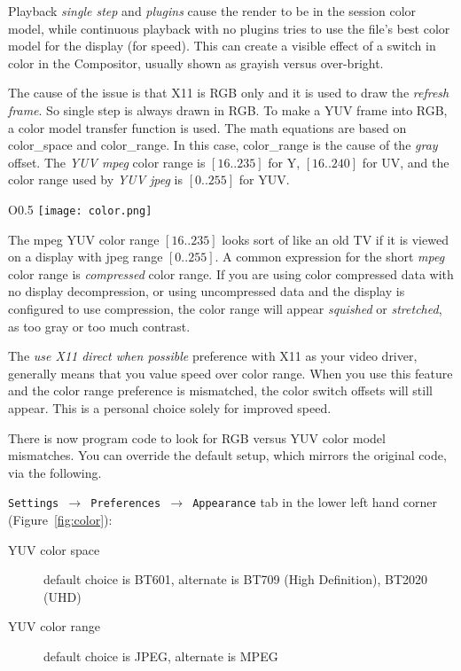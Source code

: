 Playback \textit{single step} and \textit{plugins} cause the render to be in the session color model, while continuous playback with no plugins tries to use the file’s best color model for the display (for speed).
This can create a visible effect of a switch in color in the Compositor, usually shown as grayish versus over-bright.

The cause of the issue is that X11 is RGB only and it is used to draw the \textit{refresh frame}.  So single step is always drawn in RGB.  To make a YUV frame into RGB, a color model transfer function is used.  The math equations are based on color\_space and color\_range.  In this case, color\_range is the cause of the \textit{gray} offset.  The \textit{YUV mpeg} color range is $[16..235]$ for Y, $[16..240]$ for UV, and the color range used by \textit{YUV jpeg} is $[0..255]$ for YUV.

\begin{wrapfigure}[11]{O}{0.5\textwidth} 
    \vspace{-5ex}
    \centering
    \texttt{[image: color.png]}
    \caption{Color space and Color range}
    \label{fig:color}
\end{wrapfigure} 

The mpeg YUV color range $[16..235]$ looks sort of like an old TV if it is viewed on a display with jpeg range $[0..255]$.  A common expression for the short \textit{mpeg} color range is \textit{compressed} color range.  If you are using color compressed data with no display decompression, or using uncompressed data and the display is configured to use compression, the color range will appear \textit{squished} or \textit{stretched}, as too gray or too much contrast.

The \textit{use X11 direct when possible} preference with X11 as your video driver, generally means that you value speed over color range.  When you use this feature and the color range preference is mismatched, the color switch offsets will still appear.  This is a personal choice solely for improved speed.

There is now program code to look for RGB versus YUV color model mismatches.  You can override the default setup, which mirrors the original code, via the following.

\texttt{Settings $\rightarrow$ Preferences $\rightarrow$ Appearance} tab in the lower left hand corner (Figure~\ref{fig:color}):

\begin{description}
    \item[YUV color space] default choice is BT601, alternate is BT709 (High Definition), BT2020 (UHD)
    \item[YUV color range] default choice is JPEG,   alternate is MPEG
\end{description}

